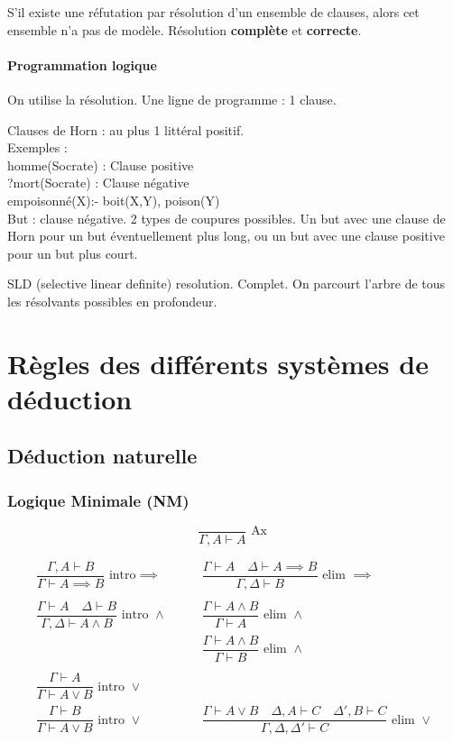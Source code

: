 \documentclass[french]{article}
\begin{document}
S'il existe une réfutation par résolution d'un ensemble de clauses, alors cet ensemble n'a pas de modèle. Résolution \textbf{complète} et \textbf{correcte}.

\paragraph{Programmation logique}
On utilise la résolution. Une ligne de programme : 1 clause.

Clauses de Horn : au plus 1 littéral positif.\\
Exemples : \\
homme(Socrate) : Clause positive\\
?mort(Socrate) : Clause négative\\
empoisonné(X):- boit(X,Y), poison(Y)\\

But : clause négative. 2 types de coupures possibles. Un but avec une clause de Horn pour un but éventuellement plus long, ou un but avec une clause positive pour un but plus court.

SLD (selective linear definite) resolution. Complet. On parcourt l'arbre de tous les résolvants possibles en profondeur.
\newpage
\appendix

\section{Règles des différents systèmes de déduction}

\subsection{Déduction naturelle}

\subsubsection{Logique Minimale (NM)}

\[\dfrac{}{\Gamma,A\vdash A} \text{ Ax }\]

\begin{align*}
\dfrac{\Gamma ,A\vdash B}{\Gamma\vdash A\implies B} \text{ intro} \implies &\qquad 
\dfrac{\Gamma\vdash A \quad \Delta\vdash A\implies B}{\Gamma ,\Delta\vdash B} \text{ elim }\implies \\ 
\\
\dfrac{\Gamma\vdash A \quad \Delta \vdash B}{\Gamma, \Delta \vdash A\land B} \text{ intro } \land  &\qquad 
\dfrac{\Gamma\vdash A \land B}{\Gamma \vdash A} \text{ elim }\land \\
&\qquad \dfrac{\Gamma\vdash A \land B}{\Gamma \vdash B} \text{ elim }\land  \\
\\
\dfrac{\Gamma\vdash A}{\Gamma \vdash A \lor B} \text{ intro }\lor &\qquad \\
\dfrac{\Gamma\vdash B}{\Gamma \vdash A \lor B} \text{ intro }\lor 
&\qquad \dfrac{\Gamma\vdash A \lor B \quad \Delta,A \vdash C \quad \Delta',B \vdash C}{\Gamma, \Delta, \Delta' \vdash C} \text{ elim }\lor 
\end{align*}
\end{document}
